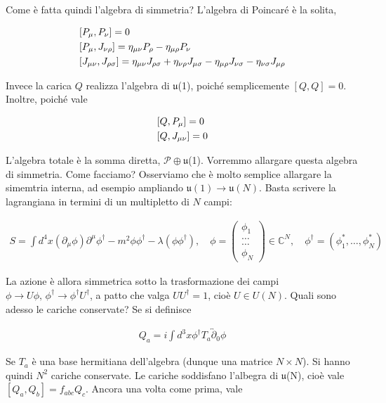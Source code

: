 \documentclass{report}
\begin{document}
Come è fatta quindi l'algebra di simmetria? L'algebra di Poincaré è la solita, 

\begin{align}
    &[P_\mu, P_\nu] = 0 \notag \\
    &[P_\mu, J_{\nu\rho}] = \eta_{\mu\nu}P_\rho - \eta_{\mu\rho}P_\nu \notag \\ 
    &[J_{\mu\nu}, J_{\rho\sigma}] = \eta_{\mu\nu}J_{\rho\sigma} +\eta_{\nu\rho}J_{\mu\sigma} - \eta_{\mu\rho}J_{\nu\sigma} -\eta_{\nu\sigma}J_{\mu\rho}
\end{align}

Invece la carica \(Q\) realizza l'algebra di \(\mathfrak{u}\)(1), poiché semplicemente \([Q, Q] =0\). Inoltre, poiché vale 

\begin{align}
    &[Q, P_\mu] = 0 \notag \\ 
    &[Q, J_{\mu\nu}] = 0 
\end{align}

L'algebra totale è la somma diretta, \(\mathcal{P} \oplus \mathfrak{u}\)(1). Vorremmo allargare questa algebra di simmetria. Come facciamo? Osserviamo che è molto semplice allargare la simemtria interna, ad esempio ampliando \(\mathfrak{u}(1) \to \mathfrak{u}(N)\). Basta scrivere la lagrangiana in termini di un multipletto di \(N\) campi: 

\begin{align}
    S = \int d^4x (\partial_\mu \phi) \partial^\mu \phi^\dagger -m^2 \phi \phi^\dagger - \lambda (\phi\phi^\dagger), \quad \phi = \begin{pmatrix}
        \phi_1 \\ \ldots \\ \ldots \\ \phi_N
    \end{pmatrix} \in \mathbb{C}^N, \quad \phi^\dagger = (\phi_1^*, \ldots, \phi_N^*)
\end{align}

La azione è allora simmetrica sotto la trasformazione dei campi \(\phi \to U\phi, \, \phi^\dagger \to \phi^\dagger U^\dagger\), a patto che valga \(UU^\dagger =1\), cioè \(U \in U(N)\). Quali sono adesso le cariche conservate? Se si definisce 

\begin{align}
    Q_a = i\int d^3x \phi^\dagger T_a \overleftrightarrow{\partial}_0 \phi
\end{align}

Se \(T_a\) è una base hermitiana dell'algebra (dunque una matrice \(N\times N\)). Si hanno quindi \(N^2\) cariche conservate. Le cariche soddisfano l'albegra di \(\mathfrak{u}\)(N), cioè vale \([Q_a, Q_b] = f_{abc}Q_c\). Ancora una volta come prima, vale 
\end{document}
